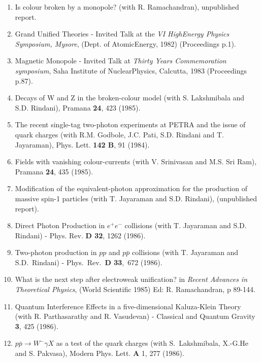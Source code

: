 \begin{enumerate}
\item Is colour broken by a monopole? (with R. Ramachandran), 
unpublished report.

\item Grand Unified Theories - Invited Talk at the {\it VI High\break Energy
Physics Symposium, Mysore}, (Dept. of Atomic\break Energy, 1982) (Proceedings p.1).

\item Magnetic Monopole - Invited Talk at {\it Thirty Years\break
Commemoration symposium}, Saha Institute of Nuclear\break Physics, Calcutta, 
1983 (Proceedings p.87).

\item Decays of W and Z in the broken-colour model (with S. Lakshmibala
and S.D. Rindani), Pramana {\bf 24}, 423 (1985).

\item The recent single-tag two-photon experiments at PETRA and the
issue of quark charges (with R.M. Godbole, J.C. Pati, S.D. Rindani and
T. Jayaraman), Phys. Lett. {\bf 142 B}, 91 (1984).

\item Fields with vanishing colour-currents (with V. Srinivasan and M.S.
Sri Ram), Pramana {\bf 24}, 435 (1985).
 
\item Modification of the equivalent-photon approximation for the
production of massive spin-1 particles (with T. Jayaraman and S.D.
Rindani), (unpublished report).

\item Direct Photon Production in $e^+ e^-$ collisions (with T.
Jaya\-raman and S.D. Rindani) - Phys. Rev. {\bf D 32}, 1262 (1986).

\item Two-photon production in $pp$ and $p\bar{p}$ collisions (with T.
Jaya\-raman and S.D.\ Rindani) - Phys.\ Rev.\ {\bf D 33},\ 672 (1986).

\item What is the next step after electroweak unification? in {\em
Recent Advances in Theoretical Physics}, (World Scientific 1985) Ed: R.
Ramachandran, p 89-144.

\item Quantum Interference Effects in a five-dimensional Kaluza-Klein
Theory (with R. Parthasarathy and R. Vasudevan) - Classical and Quantum
Gravity {\bf 3}, 425 (1986).

\item $p\bar{p} \rightarrow W^- \gamma X$ as a test of the quark
charges (with S.\ Lakshmi\-bala, X.-G.He and S. Pakvasa), Modern Phys.
Lett. {\bf A} 1, 277 (1986).


\end{enumerate}
